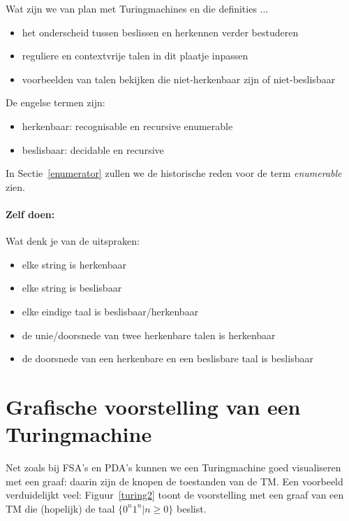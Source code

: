 Wat zijn we van plan met Turingmachines en die definities ...

\begin{itemize}
\item het onderscheid tussen beslissen en herkennen verder bestuderen
\item reguliere en contextvrije talen in dit plaatje inpassen
\item voorbeelden van talen bekijken die niet-herkenbaar zijn of
niet-beslisbaar
\end{itemize}

De engelse termen zijn:
\begin{itemize}
\item herkenbaar: recognisable en recursive enumerable
\item beslisbaar: decidable en recursive
\end{itemize}
In Sectie~\ref{enumerator} zullen we de historische reden voor de
term {\em enumerable} zien.


\paragraph{Zelf doen:} Wat denk je van de uitspraken:

\begin{itemize}
\item elke string is herkenbaar
\item elke string is beslisbaar
\item elke eindige taal is beslisbaar/herkenbaar
\item de unie/doorsnede van twee herkenbare talen is herkenbaar
\item de doorsnede van een herkenbare en een beslisbare taal is beslisbaar
\end{itemize}




\section{Grafische voorstelling van een Turingmachine}

Net zoals bij FSA's en PDA's kunnen we een Turingmachine goed
visualiseren met een graaf: daarin zijn de knopen de toestanden van de
TM. Een voorbeeld verduidelijkt veel: Figuur~\ref{turing2} toont de
voorstelling met een graaf van een TM die (hopelijk) de taal
$\{0^n1^n|n \geq 0\}$ beslist.




